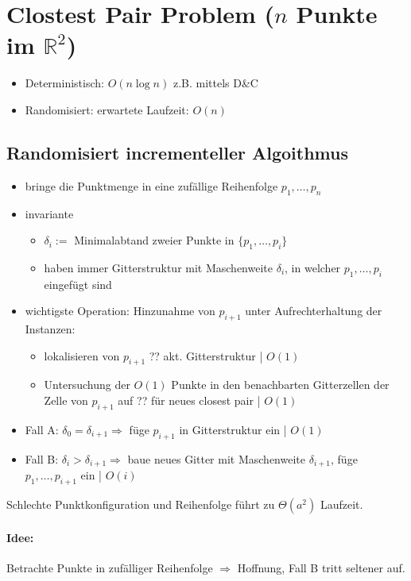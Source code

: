 \section{Clostest Pair Problem ($n$ Punkte im $\mathbb{R}^2$)}
\begin{itemize}
	\item Deterministisch: $O(n \log n)$ z.B. mittels D\&C
	\item Randomisiert: erwartete Laufzeit: $O(n)$
\end{itemize}
\subsection{Randomisiert incrementeller Algoithmus}
\begin{itemize}
	\item bringe die Punktmenge in eine zufällige Reihenfolge $p_1,\dots,p_n$
	\item invariante
	\begin{itemize}
		\item $\delta_i :=$ Minimalabtand zweier Punkte in $\{ p_1,\dots,p_i \}$
		\item haben immer Gitterstruktur mit Maschenweite $\delta_i$, in welcher $p_1,\dots,p_i$ eingefügt sind
	\end{itemize}
	\item wichtigste Operation: Hinzunahme von $p_{i+1}$ unter Aufrechterhaltung der Instanzen:
	\begin{itemize}
		\item lokalisieren von $p_{i+1}$ ?? akt. Gitterstruktur | $O(1)$
		\item Untersuchung der $O(1)$ Punkte in den benachbarten Gitterzellen der Zelle von $p_{i+1}$ auf ?? für neues closest pair | $O(1)$
	\end{itemize}
	\item[] Fall A: $\delta_0 = \delta_{i+1} \Rightarrow$ füge $p_{i+1}$ in Gitterstruktur ein | $O(1)$
	\item[] Fall B: $\delta_i > \delta_{i+1} \Rightarrow$ baue neues Gitter mit Maschenweite $\delta_{i+1}$, füge $p_1,\dots,p_{i+1}$ ein | $O(i)$
\end{itemize}

Schlechte Punktkonfiguration und Reihenfolge führt zu $\Theta(a^2)$ Laufzeit.

\paragraph*{Idee:} Betrachte Punkte in zufälliger Reihenfolge $\Rightarrow$ Hoffnung, Fall B tritt seltener auf.

